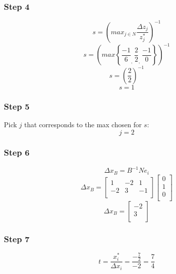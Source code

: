 \documentclass[14pt]{extarticle}
\begin{document}
\subsubsection*{Step 4}
\[
    s = \left(max_{j \in N} \frac{\Delta z_j}{z^*_j}\right)^{-1}
\]
\[
    s = \left(max \left\{ \frac{-1}{6}_{\textstyle,}\ \frac{2}{2}_{\textstyle,}\ \frac{-1}{0} \right\} \right)^{-1}
\]
\[
    s = \left(\frac{2}{2}\right)^{-1}
\]
\[
    s = 1
\]

\subsubsection*{Step 5}
Pick $j$ that corresponds to the max chosen for $s$:
\[
    j = 2
\]

\subsubsection*{Step 6}
\[
    \Delta x_B = B^{-1}N e_i
\]
\[
    \Delta x_B =
    \begin{bmatrix}
        1 & -2 & 1 \\
        -2 & 3 & -1 \\
    \end{bmatrix}
    \begin{bmatrix}
        0 \\
        1 \\
        0 \\
    \end{bmatrix}
\]
\[
    \Delta x_B =
    \begin{bmatrix}
        -2 \\
        3 \\
    \end{bmatrix}
\]

\subsubsection*{Step 7}
\[
    t = \frac{x^*_i}{\Delta x_i} = \frac{-\frac{7}{2}}{-2} = \frac{7}{4}
\]
\end{document}
